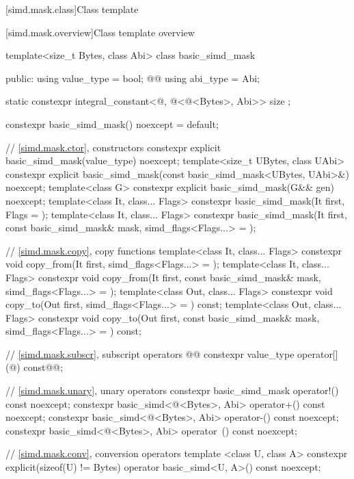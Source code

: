[simd.mask.class]{Class template }

[simd.mask.overview]{Class template  overview}

\begin{codeblock}
template<size_t Bytes, class Abi> class basic_simd_mask {
public:
  using value_type = bool;
  @@
  using abi_type = Abi;

  static constexpr integral_constant<@\simdsizetype@, @\simdsizev@<@\integerfrom@<Bytes>, Abi>> size {};

  constexpr basic_simd_mask() noexcept = default;

  // \ref{simd.mask.ctor},  constructors
  constexpr explicit basic_simd_mask(value_type) noexcept;
  template<size_t UBytes, class UAbi>
    constexpr explicit basic_simd_mask(const basic_simd_mask<UBytes, UAbi>&) noexcept;
  template<class G> constexpr explicit basic_simd_mask(G&& gen) noexcept;
  template<class It, class... Flags>
    constexpr basic_simd_mask(It first, Flags = {});
  template<class It, class... Flags>
    constexpr basic_simd_mask(It first, const basic_simd_mask& mask, simd_flags<Flags...> = {});

  // \ref{simd.mask.copy},  copy functions
  template<class It, class... Flags>
    constexpr void copy_from(It first, simd_flags<Flags...> = {});
  template<class It, class... Flags>
    constexpr void copy_from(It first, const basic_simd_mask& mask, simd_flags<Flags...> = {});
  template<class Out, class... Flags>
    constexpr void copy_to(Out first, simd_flags<Flags...> = {}) const;
  template<class Out, class... Flags>
    constexpr void copy_to(Out first, const basic_simd_mask& mask, simd_flags<Flags...> = {}) const;

  // \ref{simd.mask.subscr},  subscript operators
  @@
  constexpr value_type operator[](@\simdsizetype@) const@\wgRem{\&}@;

  // \ref{simd.mask.unary},  unary operators
  constexpr basic_simd_mask operator!() const noexcept;
  constexpr basic_simd<@\integerfrom@<Bytes>, Abi> operator+() const noexcept;
  constexpr basic_simd<@\integerfrom@<Bytes>, Abi> operator-() const noexcept;
  constexpr basic_simd<@\integerfrom@<Bytes>, Abi> operator~() const noexcept;

  // \ref{simd.mask.conv},  conversion operators
  template <class U, class A>
    constexpr explicit(sizeof(U) != Bytes) operator basic_simd<U, A>() const noexcept;

}
\end{codeblock}

